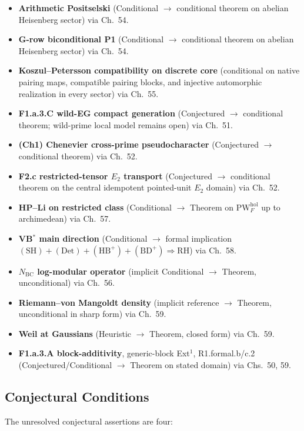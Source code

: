 \begin{itemize}
\item \textbf{Arithmetic Positselski} (Conditional \(\to\)
conditional theorem on abelian Heisenberg sector) via
Ch.~54.
\item \textbf{G-row biconditional P1} (Conditional \(\to\)
conditional theorem on abelian Heisenberg sector) via
Ch.~54.
\item \textbf{Koszul--Petersson compatibility on discrete core}
(conditional on native pairing maps, compatible pairing blocks,
and injective automorphic realization in every sector) via Ch.~55.
\item \textbf{F1.a.3.C wild-EG compact generation} (Conjectured
\(\to\) conditional theorem; wild-prime local model remains open) via
Ch.~51.
\item \textbf{(Ch1) Chenevier cross-prime pseudocharacter}
(Conjectured \(\to\) conditional theorem) via Ch.~52.
\item \textbf{F2.c restricted-tensor \(E_{2}\) transport}
(Conjectured \(\to\) conditional theorem on the central idempotent
pointed-unit \(E_{2}\) domain) via Ch.~52.
\item \textbf{HP--Li on restricted class} (Conditional \(\to\)
Theorem on \(\mathrm{PW}^{\mathrm{hol}}_{F}\) up to archimedean) via
Ch.~57.
\item \textbf{VB\(^{*}\) main direction} (Conditional \(\to\)
formal implication
\((\mathrm{SH})+(\mathrm{Det})+(\mathrm{HB}^{+})+(\mathrm{BD}^{+})
\Rightarrow \mathrm{RH}\)) via Ch.~58.
\item \textbf{\(N_{\mathrm{BC}}\) log-modular operator} (implicit
Conditional \(\to\) Theorem, unconditional) via Ch.~56.
\item \textbf{Riemann--von Mangoldt density} (implicit reference
\(\to\) Theorem, unconditional in sharp form) via Ch.~59.
\item \textbf{Weil at Gaussians} (Heuristic \(\to\) Theorem, closed
form) via Ch.~59.
\item \textbf{F1.a.3.A block-additivity}, generic-block Ext\({}^{1}\),
R1.formal.b/c.2 (Conjectured/Conditional \(\to\) Theorem on
stated domain) via Chs.~50, 59.
\end{itemize}

\subsection{Conjectural Conditions}
\label{v4-arith:w5-synth:residual-conjectures}

The unresolved conjectural assertions are four:

